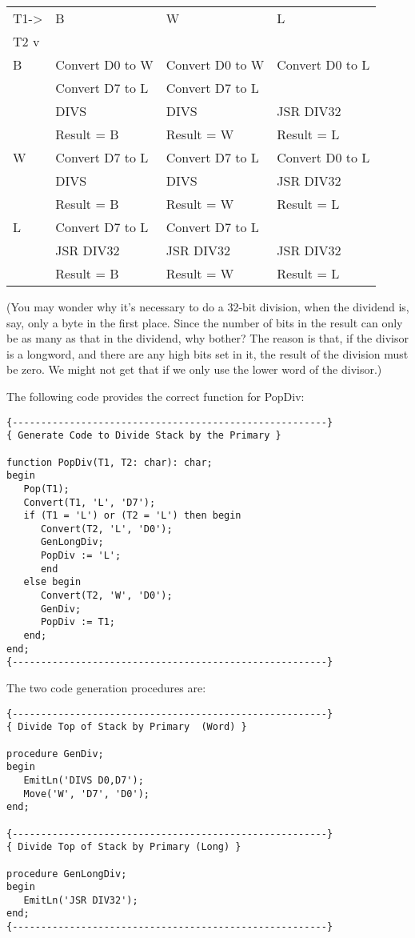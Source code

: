 \bigskip
\begin{tabular}{llll} \hline
T1-> & B & W & L \\
T2 v &   &   &   \\ \hline
B	 & Convert D0 to W & Convert D0 to W & Convert D0 to L \\
     & Convert D7 to L & Convert D7 to L & \\
     & DIVS & DIVS & JSR DIV32 \\
     & Result = B	& Result = W & Result = L \\ \hline
W	 & Convert D7 to L & Convert D7 to L & Convert D0 to L \\
     & DIVS & DIVS & JSR DIV32 \\
     & Result = B & Result = W & Result = L \\ \hline
L	 & Convert D7 to L &  Convert D7 to L & \\
     & JSR DIV32 & JSR DIV32 & JSR DIV32 \\
     & Result = B & Result = W	& Result = L \\ \hline
\end{tabular}
\bigskip

(You may wonder why it's necessary to do a 32-bit  division, when the  dividend is, say, only a byte in the first place. Since the number  of bits in the result can only be as many as that in  the dividend, why  bother?   The reason is that, if the divisor is a longword, and  there  are any high bits set in it, the result of the division must  be zero. We might not get that if we only use the lower word of the divisor.)

The following code provides the correct function for PopDiv:

\begin{verbatim}
{-------------------------------------------------------}
{ Generate Code to Divide Stack by the Primary }

function PopDiv(T1, T2: char): char;
begin
   Pop(T1);
   Convert(T1, 'L', 'D7');
   if (T1 = 'L') or (T2 = 'L') then begin
      Convert(T2, 'L', 'D0');
      GenLongDiv;
      PopDiv := 'L';
      end
   else begin
      Convert(T2, 'W', 'D0');
      GenDiv;
      PopDiv := T1;
   end;
end;
{-------------------------------------------------------}
\end{verbatim}

The two code generation procedures are:

\begin{verbatim}
{-------------------------------------------------------}
{ Divide Top of Stack by Primary  (Word) }

procedure GenDiv;
begin
   EmitLn('DIVS D0,D7');
   Move('W', 'D7', 'D0');
end;

{-------------------------------------------------------}
{ Divide Top of Stack by Primary (Long) }

procedure GenLongDiv;
begin
   EmitLn('JSR DIV32');
end;
{-------------------------------------------------------}
\end{verbatim}

